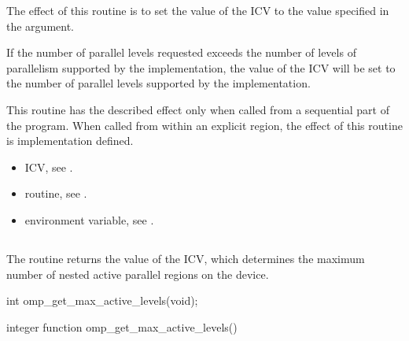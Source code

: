\effect
The effect of this routine is to set the value of the  ICV to the value 
specified in the argument. 

If the number of parallel levels requested exceeds the number of levels of parallelism 
supported by the implementation, the value of the  ICV will be set 
to the number of parallel levels supported by the implementation.

This routine has the described effect only when called from a sequential part of the 
program. When called from within an explicit  region, the effect of this 
routine is implementation defined.

\crossreferences
\begin{itemize}
\item {} ICV, see 
.

\item {} routine, see 
.

\item {} environment variable, see 
.
\end{itemize}










\subsection{}
\label{subsec:omp_get_max_active_levels}
\summary
The  routine returns the value of the 
 ICV, which determines the maximum number of nested active parallel regions 
on the device. 

\format
\ccppspecificstart
\begin{boxedcode}
int omp\_get\_max\_active\_levels(void);
\end{boxedcode}
\ccppspecificend

\fortranspecificstart
\begin{boxedcode}
integer function omp\_get\_max\_active\_levels()
\end{boxedcode}
\fortranspecificend

